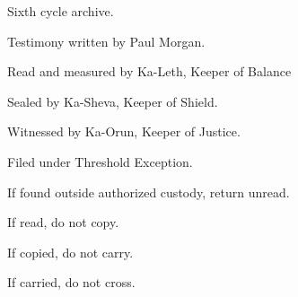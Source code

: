 \typethresholdexception

Sixth cycle archive.\par

Testimony written by Paul Morgan.\par

Read and measured by Ka-Leth, Keeper of Balance\par

Sealed by Ka-Sheva, Keeper of Shield.\par

Witnessed by Ka-Orun, Keeper of Justice.\par

Filed under Threshold Exception.\par

If found outside authorized custody, return unread.\par

If read, do not copy.\par

If copied, do not carry.\par

If carried, do not cross.\par

\ornament
